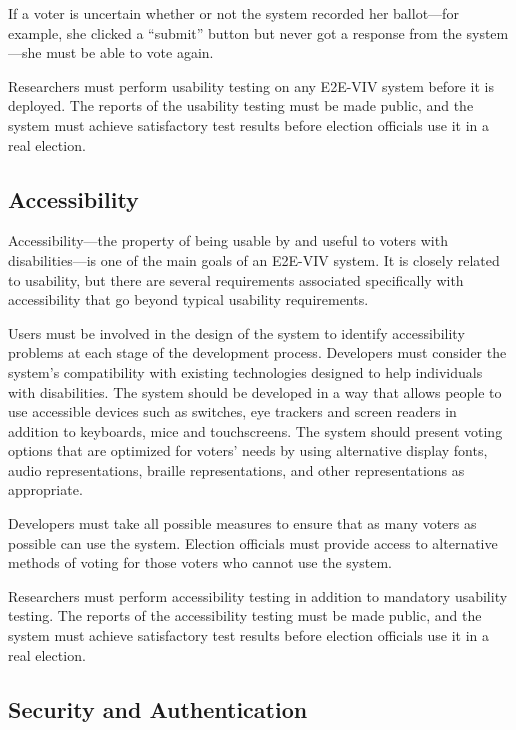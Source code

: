 If a voter is uncertain whether or not the system recorded her
ballot---for example, she clicked a ``submit'' button but never got a
response from the system---she must be able to vote again.

Researchers must perform usability testing on any E2E-VIV system
before it is deployed. The reports of the usability testing must be
made public, and the system must achieve satisfactory test results
before election officials use it in a real election.

\subsection{Accessibility}

Accessibility---the property of being usable by and useful to voters
with disabilities---is one of the main goals of an E2E-VIV system. It
is closely related to usability, but there are several requirements
associated specifically with accessibility that go beyond typical
usability requirements.

Users must be involved in the design of the system to identify
accessibility problems at each stage of the development
process. Developers must consider the system's compatibility with
existing technologies designed to help individuals with disabilities.
The system should be developed in a way that allows people to use
accessible devices such as switches, eye trackers and screen readers
in addition to keyboards, mice and touchscreens. The system should
present voting options that are optimized for voters' needs by using
alternative display fonts, audio representations, braille
representations, and other representations as appropriate.

Developers must take all possible measures to ensure that as many
voters as possible can use the system. Election officials must provide
access to alternative methods of voting for those voters who cannot
use the system.

Researchers must perform accessibility testing in addition to
mandatory usability testing. The reports of the accessibility testing
must be made public, and the system must achieve satisfactory test
results before election officials use it in a real election.

\subsection{Security and Authentication}

